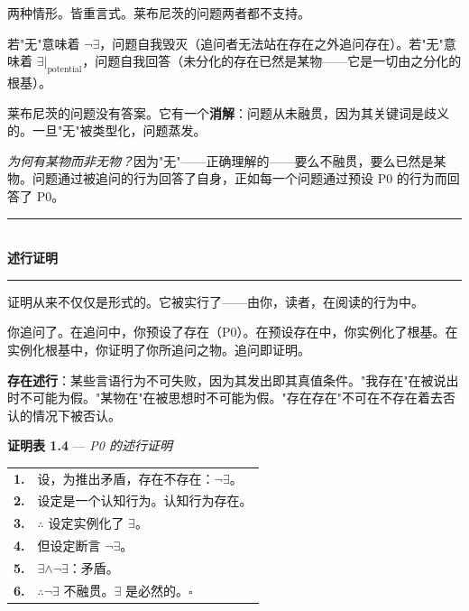 \documentclass[10pt, openany, oneside]{book}
\renewcommand{\normalsize}{\fontsize{10}{13}\selectfont}
\begin{document}
\vspace{0.8em}

\noindent 两种情形。皆重言式。莱布尼茨的问题两者都不支持。

若"无"意味着 $\neg\exists$，问题自我毁灭（追问者无法站在存在之外追问存在）。若"无"意味着 $\exists|_{\text{potential}}$，问题自我回答（未分化的存在已然是某物——它是一切由之分化的根基）。

莱布尼茨的问题没有答案。它有一个\textbf{消解}：问题从未融贯，因为其关键词是歧义的。一旦"无"被类型化，问题蒸发。

\textit{为何有某物而非无物？}因为"无"——正确理解的——要么不融贯，要么已然是某物。问题通过被追问的行为回答了自身，正如每一个问题通过预设 P0 的行为而回答了 P0。

\vspace{1.5em}


\begin{center}
    \rule{0.3\textwidth}{0.4pt}\\[0.5em]
    {\normalsize\bfseries\scshape 述行证明}\\[0.3em]
    \rule{0.3\textwidth}{0.4pt}
\end{center}

\vspace{1em}

\noindent 证明从来不仅仅是形式的。它被实行了——由你，读者，在阅读的行为中。

你追问了。在追问中，你预设了存在（P0）。在预设存在中，你实例化了根基。在实例化根基中，你证明了你所追问之物。追问即证明。

\textbf{存在述行}：某些言语行为不可失败，因为其发出即其真值条件。"我存在"在被说出时不可能为假。"某物在"在被思想时不可能为假。"存在存在"不可在不存在着去否认的情况下被否认。

\vspace{0.5em}

\textbf{证明表 1.4} --- \textit{P0 的述行证明}

\vspace{0.5em}

\noindent\begin{tabular}{r p{}}
\textbf{1.} & 设，为推出矛盾，存在不存在：$\neg\exists$。\\[0.3em]
\textbf{2.} & 设定是一个认知行为。认知行为存在。\\[0.3em]
\textbf{3.} & $\therefore$ 设定实例化了 $\exists$。\\[0.3em]
\textbf{4.} & 但设定断言 $\neg\exists$。\\[0.3em]
\textbf{5.} & $\exists \wedge \neg\exists$：矛盾。\\[0.3em]
\textbf{6.} & $\therefore \neg\exists$ 不融贯。$\exists$ 是必然的。$\square$ \\[0.3em]
\end{tabular}
\end{document}
